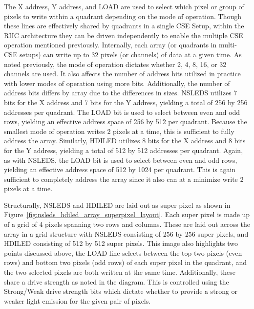     The X address, Y address, and LOAD are used to select which pixel or group of pixels to write within a quadrant depending on the mode of operation. Though these lines are effectively shared by quadrants in a single CSE Setup, within the RIIC architecture they can be driven independently to enable the multiple CSE operation mentioned previously. Internally, each array (or quadrants in multi-CSE setups) can write up to 32 pixels (or channels) of data at a given time. As noted previously, the mode of operation dictates whether 2, 4, 8, 16, or 32 channels are used. It also affects the number of address bits utilized in practice with lower modes of operation using more bits. Additionally, the number of address bits differs by array due to the differences in sizes. NSLEDS utilizes 7 bits for the X address and 7 bits for the Y address, yielding a total of 256 by 256 addresses per quadrant. The LOAD bit is used to select between even and odd rows, yielding an effective address space of 256 by 512 per quadrant. Because the smallest mode of operation writes 2 pixels at a time, this is sufficient to fully address the array. Similarly, HDILED utilizes 8 bits for the X address and 8 bits for the Y address, yielding a total of 512 by 512 addresses per quadrant. Again, as with NSLEDS, the LOAD bit is used to select between even and odd rows, yielding an effective address space of 512 by 1024 per quadrant. This is again sufficient to completely address the array since it also can at a minimize write 2 pixels at a time.

    Structurally, NSLEDS and HDILED are laid out as super pixel as shown in Figure~\ref{fig:nsleds_hdiled_array_superpixel_layout}. Each super pixel is made up of a grid of 4 pixels spanning two rows and columns. These are laid out across the array in a grid structure with NSLEDS consisting of 256 by 256 super pixels, and HDILED consisting of 512 by 512 super pixels. This image also highlights two points discussed above, the LOAD line selects between the top two pixels (even rows) and bottom two pixels (odd rows) of each super pixel in the quadrant, and the two selected pixels are both written at the same time. Additionally, these share a drive strength as noted in the diagram. This is controlled using the Strong/Weak drive strength bits which dictate whether to provide a strong or weaker light emission for the given pair of pixels.

